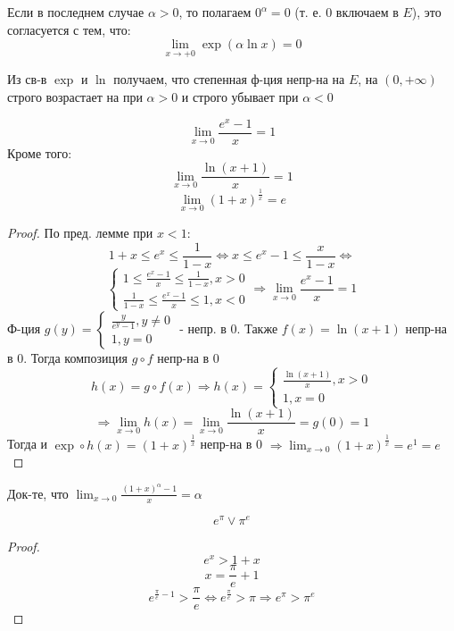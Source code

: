 \begin{note}
Если в последнем случае $\alpha > 0$, то полагаем $0^{\alpha} = 0$ (т. е. $0$ включаем в $E$), это согласуется с тем, что:
\[
  \lim_{x \to +0} \exp(\alpha \ln x) = 0
\]
\end{note}
\begin{note}
Из св-в $\exp$ и $\ln$ получаем, что степенная ф-ция непр-на на $E$, на $(0, +\infty)$ строго возрастает на  при $\alpha > 0$ и строго убывает при $\alpha < 0$
\end{note}
\begin{lemma}
\[
\lim_{x\to 0} \frac{e^{x} - 1}{x} = 1
\]
Кроме того:
\[
\lim_{x\to 0} \frac{\ln(x + 1)}{x} = 1
\]
\[
\lim_{x\to 0} (1 + x)^{\frac{1}{x}} = e
\]
\end{lemma}
\begin{proof}
По пред. лемме при $x < 1$:
\[
1 + x \leq e^{x} \leq \frac{1}{1 - x} \iff x \leq e^{x} - 1 \leq \frac{x}{1 - x} \iff
\]
\[
  \begin{cases}
1 \leq \frac{e^{x} - 1}{x} \leq \frac{1}{1 - x}, x > 0 \\
\frac{1}{1 - x} \leq \frac{e^{x} - 1}{x} \leq 1, x < 0
  \end{cases} \Rightarrow \lim_{x\to 0} \frac{e^{x} - 1}{x} = 1
\]
Ф-ция $g(y) = \begin{cases}
\frac{y}{e^{y} - 1}, y \neq 0 \\
1, y = 0
\end{cases}$ - непр. в 0. Также $f(x) = \ln(x + 1)$ непр-на в 0. Тогда композиция $g \circ f$ непр-на в 0
\[
h(x) = g \circ f(x) \Rightarrow h(x) = \begin{cases}
  \frac{\ln(x + 1)}{x}, x > 0 \\
  1, x = 0
\end{cases}
\]
\[
  \Rightarrow \lim_{x\to 0} h(x) = \lim_{x\to 0} \frac{\ln (x + 1)}{x} = g(0) = 1 
\]
Тогда и $\exp \circ h(x) = (1 + x)^{\frac{1}{x}}$ непр-на в 0 $\Rightarrow \lim_{x\to 0} (1 + x)^{\frac{1}{x}} = e^{1} = e$
\end{proof}
\begin{task}
Док-те, что $\lim_{x\to 0} \frac{(1 + x)^{\alpha} - 1}{x} = \alpha$
\end{task}
\begin{example}
\[
e^{\pi} \lor \pi^{e}
\]
\end{example}
\begin{proof}
\[
e^{x} > 1 + x
\]
\[
x = \frac{\pi}{e} + 1
\]
\[
e^{\frac{\pi}{e} - 1} > \frac{\pi}{e} \iff e^{\frac{\pi}{e}} > \pi \Rightarrow e^{\pi} > \pi^{e}
\]
\end{proof}
